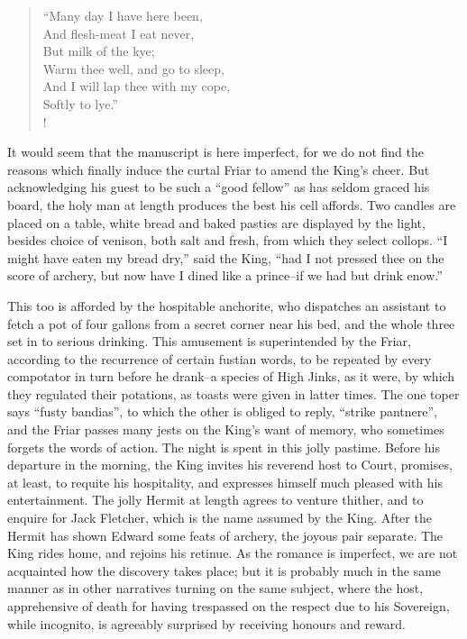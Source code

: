 \begin{verse}
``Many day I have here been,\\
And flesh-meat I eat never,\\
But milk of the kye;\\
Warm thee well, and go to sleep,\\
And I will lap thee with my cope,\\
Softly to lye.''\\!
\end{verse}

It would seem that the manuscript is here imperfect, for we do not find
the reasons which finally induce the curtal Friar to amend the King's
cheer. But acknowledging his guest to be such a ``good fellow'' as has
seldom graced his board, the holy man at length produces the best his
cell affords. Two candles are placed on a table, white bread and baked
pasties are displayed by the light, besides choice of venison, both salt
and fresh, from which they select collops. ``I might have eaten my bread
dry,'' said the King, ``had I not pressed thee on the score of archery,
but now have I dined like a prince--if we had but drink enow.''

This too is afforded by the hospitable anchorite, who dispatches an
assistant to fetch a pot of four gallons from a secret corner near his
bed, and the whole three set in to serious drinking. This amusement is
superintended by the Friar, according to the recurrence of certain
fustian words, to be repeated by every compotator in turn before he
drank--a species of High Jinks, as it were, by which they regulated
their potations, as toasts were given in latter times. The one toper
says ``fusty bandias'', to which the other is obliged to reply, ``strike
pantnere'', and the Friar passes many jests on the King's want of
memory, who sometimes forgets the words of action. The night is spent in
this jolly pastime. Before his departure in the morning, the King
invites his reverend host to Court, promises, at least, to requite his
hospitality, and expresses himself much pleased with his entertainment.
The jolly Hermit at length agrees to venture thither, and to enquire for
Jack Fletcher, which is the name assumed by the King. After the Hermit
has shown Edward some feats of archery, the joyous pair separate. The
King rides home, and rejoins his retinue. As the romance is imperfect,
we are not acquainted how the discovery takes place; but it is probably
much in the same manner as in other narratives turning on the same
subject, where the host, apprehensive of death for having trespassed on
the respect due to his Sovereign, while incognito, is agreeably
surprised by receiving honours and reward.

